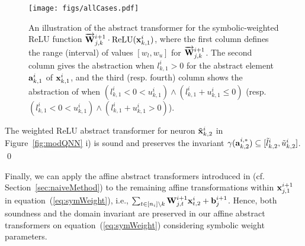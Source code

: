 \begin{figure*}[t]
    \centering
    \texttt{[image: figs/allCases.pdf]}
    \caption{An illustration of the abstract transformer for the symbolic-weighted ReLU function $\overrightarrow{{\mathbf{W}}}^{i+1}_{j,k}\cdot \text{ReLU}({\mathbf{x}}^i_{k,1})$, where the first column defines the range (interval) of values $[w_l, w_u]$ for $\overrightarrow{{\mathbf{W}}}^{i+1}_{j,k}$. The second column gives the abstraction when $l^i_{k,1}>0$ for the abstract element ${\mathbf{a}}^i_{k,1}$ of ${\mathbf{x}}^i_{k,1}$, and the third (resp. fourth) column shows the abstraction of when $(l^i_{k,1} <0<u^i_{k,1}) \wedge (l^i_{k,1}+u^i_{k,1}\le 0)$ (resp. $(l^i_{k,1} < 0 < u^i_{k,1}) \wedge (l^i_{k,1}+u^i_{k,1}>0)$).}

    \label{fig:allCases}
\end{figure*}

\begin{theorem}\label{the:deepPolyR_weight}
    The weighted ReLU abstract transformer for neuron $\tilde{{\mathbf{x}}}^i_{k,2}$ in Figure~\ref{fig:modQNN} i) is sound
    and preserves the invariant $\gamma ({\mathbf{a}}^{i,*}_{k,2}) \subseteq [\tilde{l}^i_{k,2}, \tilde{u}^i_{k,2}]$. \qed
\end{theorem}


Finally, we can apply the affine abstract transformers introduced in \deepPoly (cf. Section~\ref{sec:naiveMethod}) to the remaining affine transformations within ${\mathbf{x}}^{i+1}_{j,1}$ in equation~(\ref{eq:symWeight}), i.e., $\sum_{t\in[n_i]\backslash k} {\mathbf{W}}^{i+1}_{j,t}{\mathbf{x}}^i_{t,2}+{\mathbf{b}}^{i+1}_j$. Hence, both soundness and the domain invariant are preserved in our affine abstract transformers on equation~(\ref{eq:symWeight}) considering symbolic weight parameters.

